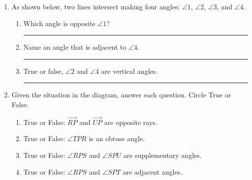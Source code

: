 \begin{enumerate}
\newpage
\item As shown below, two lines intersect making four angles: $\angle 1$, $\angle 2$, $\angle 3$, and $\angle 4$.
\begin{center}
\end{center}
\begin{enumerate}
\item Which angle is opposite $\angle 1$? \rule{4cm}{0.15mm} \bigskip
\item Name an angle that is adjacent to $\angle 4$. \rule{4cm}{0.15mm} \bigskip
\item True or false, $\angle 2$ and $\angle 4$ are vertical angles. \rule{3cm}{0.15mm}
\end{enumerate}

\item Given the situation in the diagram, answer each question. Circle True or False.
  \begin{center}
  \end{center}
  \begin{enumerate}
  \item True or False: $\overrightarrow{RP}$ and $\overrightarrow{UP}$ are opposite rays.\bigskip
  \item True or False: $\angle TPR$ is an obtuse angle.\bigskip
  \item True or False: $\angle RPS$ and $\angle SPU$ are supplementary angles.\bigskip
  \item True or False: $\angle RPS$ and $\angle SPT$ are adjacent angles. \bigskip
  \end{enumerate}


\end{enumerate}

